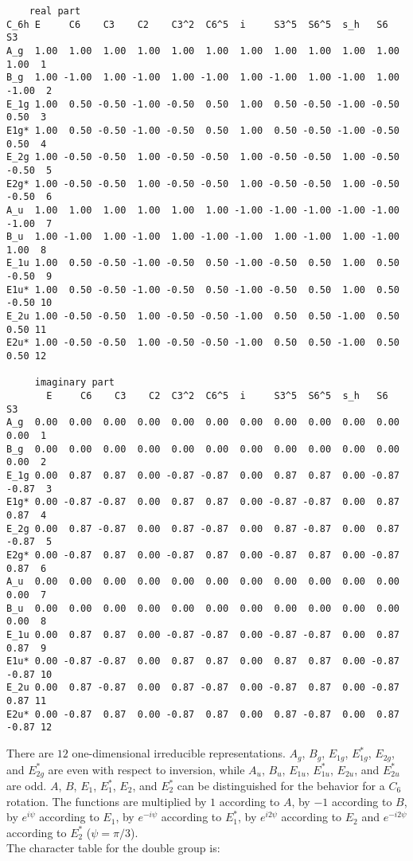 \documentclass[12pt,a4paper,twoside]{report}
\begin{document}
\begin{tcolorbox}
\begin{scriptsize}
\begin{verbatim}
    real part
C_6h E     C6    C3    C2    C3^2  C6^5  i     S3^5  S6^5  s_h   S6    S3   
A_g  1.00  1.00  1.00  1.00  1.00  1.00  1.00  1.00  1.00  1.00  1.00  1.00  1
B_g  1.00 -1.00  1.00 -1.00  1.00 -1.00  1.00 -1.00  1.00 -1.00  1.00 -1.00  2
E_1g 1.00  0.50 -0.50 -1.00 -0.50  0.50  1.00  0.50 -0.50 -1.00 -0.50  0.50  3
E1g* 1.00  0.50 -0.50 -1.00 -0.50  0.50  1.00  0.50 -0.50 -1.00 -0.50  0.50  4
E_2g 1.00 -0.50 -0.50  1.00 -0.50 -0.50  1.00 -0.50 -0.50  1.00 -0.50 -0.50  5
E2g* 1.00 -0.50 -0.50  1.00 -0.50 -0.50  1.00 -0.50 -0.50  1.00 -0.50 -0.50  6
A_u  1.00  1.00  1.00  1.00  1.00  1.00 -1.00 -1.00 -1.00 -1.00 -1.00 -1.00  7
B_u  1.00 -1.00  1.00 -1.00  1.00 -1.00 -1.00  1.00 -1.00  1.00 -1.00  1.00  8
E_1u 1.00  0.50 -0.50 -1.00 -0.50  0.50 -1.00 -0.50  0.50  1.00  0.50 -0.50  9
E1u* 1.00  0.50 -0.50 -1.00 -0.50  0.50 -1.00 -0.50  0.50  1.00  0.50 -0.50 10
E_2u 1.00 -0.50 -0.50  1.00 -0.50 -0.50 -1.00  0.50  0.50 -1.00  0.50  0.50 11
E2u* 1.00 -0.50 -0.50  1.00 -0.50 -0.50 -1.00  0.50  0.50 -1.00  0.50  0.50 12

     imaginary part
       E     C6    C3    C2  C3^2  C6^5  i     S3^5  S6^5  s_h   S6    S3   
A_g  0.00  0.00  0.00  0.00  0.00  0.00  0.00  0.00  0.00  0.00  0.00  0.00  1
B_g  0.00  0.00  0.00  0.00  0.00  0.00  0.00  0.00  0.00  0.00  0.00  0.00  2
E_1g 0.00  0.87  0.87  0.00 -0.87 -0.87  0.00  0.87  0.87  0.00 -0.87 -0.87  3
E1g* 0.00 -0.87 -0.87  0.00  0.87  0.87  0.00 -0.87 -0.87  0.00  0.87  0.87  4
E_2g 0.00  0.87 -0.87  0.00  0.87 -0.87  0.00  0.87 -0.87  0.00  0.87 -0.87  5
E2g* 0.00 -0.87  0.87  0.00 -0.87  0.87  0.00 -0.87  0.87  0.00 -0.87  0.87  6
A_u  0.00  0.00  0.00  0.00  0.00  0.00  0.00  0.00  0.00  0.00  0.00  0.00  7
B_u  0.00  0.00  0.00  0.00  0.00  0.00  0.00  0.00  0.00  0.00  0.00  0.00  8
E_1u 0.00  0.87  0.87  0.00 -0.87 -0.87  0.00 -0.87 -0.87  0.00  0.87  0.87  9
E1u* 0.00 -0.87 -0.87  0.00  0.87  0.87  0.00  0.87  0.87  0.00 -0.87 -0.87 10
E_2u 0.00  0.87 -0.87  0.00  0.87 -0.87  0.00 -0.87  0.87  0.00 -0.87  0.87 11
E2u* 0.00 -0.87  0.87  0.00 -0.87  0.87  0.00  0.87 -0.87  0.00  0.87 -0.87 12
\end{verbatim}
\end{scriptsize}
\end{tcolorbox}

There are $12$ one-dimensional irreducible representations. $A_g$, 
$B_g$, $E_{1g}$, $E_{1g}^*$, $E_{2g}$, and $E_{2g}^*$ are even with respect to
inversion, while $A_u$, $B_u$, $E_{1u}$, $E_{1u}^*$, $E_{2u}$, and $E_{2u}^*$
are odd. $A$, $B$, $E_1$, $E_1^*$, $E_2$, and $E_2^*$ can be distinguished for
the behavior for a $C_6$ rotation. The functions are multiplied by $1$
according to $A$, by $-1$ according to $B$, by $e^{i\psi}$ according to
$E_1$, by $e^{-i\psi}$ according to $E_1^*$, by $e^{i2 \psi}$ according to
$E_2$ and $e^{-i2 \psi}$ according to $E_2^*$ ($\psi=\pi/3$). \\
The character table for the double group is:
\end{document}
